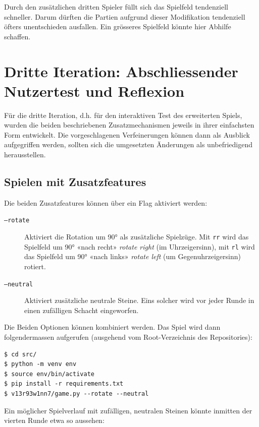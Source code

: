 \documentclass[a4paper,11pt,hidelinks]{scrartcl}
\begin{document}
Durch den zusätzlichen dritten Spieler füllt sich das Spielfeld tendenziell schneller. Darum dürften die Partien aufgrund dieser Modifikation tendenziell öfters unentschieden ausfallen. Ein grösseres Spielfeld könnte hier Abhilfe schaffen.

\clearpage

\section{Dritte Iteration: Abschliessender Nutzertest und Reflexion}

Für die dritte Iteration, d.h. für den interaktiven Test des erweiterten Spiels, wurden die beiden beschriebenen Zusatzmechanismen jeweils in ihrer einfachsten Form entwickelt. Die vorgeschlagenen Verfeinerungen können dann als Ausblick aufgegriffen werden, sollten sich die umgesetzten Änderungen als unbefriedigend herausstellen.

\subsection{Spielen mit Zusatzfeatures}

Die beiden Zusatzfeatures können über ein Flag aktiviert werden:

\begin{description}
    \item[\texttt{--rotate}] Aktiviert die Rotation um 90° als zusätzliche Spielzüge. Mit \texttt{rr} wird das Spielfeld um 90° «nach recht» \textit{rotate right} (im Uhrzeigersinn), mit \texttt{rl} wird das Spielfeld um 90° «nach links» \textit{rotate left} (um Gegenuhrzeigersinn) rotiert.
    \item[\texttt{--neutral}] Aktiviert zusätzliche neutrale Steine. Eins solcher wird vor jeder Runde in einen zufälligen Schacht eingeworfen.
\end{description}

Die Beiden Optionen können kombiniert werden. Das Spiel wird dann folgendermassen aufgerufen (ausgehend vom Root-Verzeichnis des Repositories):

\begin{lstlisting}
$ cd src/
$ python -m venv env
$ source env/bin/activate
$ pip install -r requirements.txt
$ v13r93w1nn7/game.py --rotate --neutral
\end{lstlisting}

Ein möglicher Spielverlauf mit zufälligen, neutralen Steinen könnte inmitten der vierten Runde etwa so aussehen:
\end{document}
